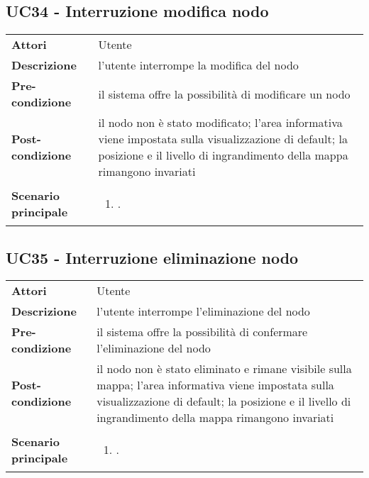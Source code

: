 \subsection{UC34 - Interruzione modifica nodo} 
\label{sssec:UC34} 
\def\arraystretch{1.5}
\begin{tabularx}{\textwidth}{l|p{}}
	\rowcolor{I} \multicolumn{2}{c}{\color{white}\textbf{UC34 - Interruzione modifica nodo}} \\
	\toprule
	\endhead
	\textbf{Attori} & Utente\\
	\textbf{Descrizione} & l'utente interrompe la modifica del nodo\\
	\textbf{Pre-condizione} & il sistema offre la possibilità di modificare un nodo\\
	\textbf{Post-condizione} & il nodo non è stato modificato;  l'area informativa viene impostata sulla visualizzazione di default; la posizione e il livello di ingrandimento della mappa rimangono invariati\\
	\textbf{Scenario principale} & \vspace{-1.2em}\begin{enumerate}[leftmargin=*,noitemsep,nosep]
		\item \nameref{sssec:UC34}.
	\end{enumerate}\\
	\bottomrule
\end{tabularx}
\subsection{UC35 - Interruzione eliminazione nodo} 
\label{sssec:UC35} 
\def\arraystretch{1.5}
\begin{tabularx}{\textwidth}{l|p{}}
	\rowcolor{I} \multicolumn{2}{c}{\color{white}\textbf{UC35 - Interruzione eliminazione nodo}} \\
	\toprule
	\endhead
	\textbf{Attori} & Utente\\
	\textbf{Descrizione} & l'utente interrompe l'eliminazione del nodo\\
	\textbf{Pre-condizione} & il sistema offre la possibilità di confermare l'eliminazione del nodo\\
	\textbf{Post-condizione} & il nodo non è stato eliminato e rimane visibile sulla mappa; l'area informativa viene impostata sulla visualizzazione di default;  la posizione e il livello di ingrandimento della mappa rimangono invariati\\
	\textbf{Scenario principale} & \vspace{-1.2em}\begin{enumerate}[leftmargin=*,noitemsep,nosep]
		\item \nameref{sssec:UC35}.
	\end{enumerate}\\
	\bottomrule
\end{tabularx}
